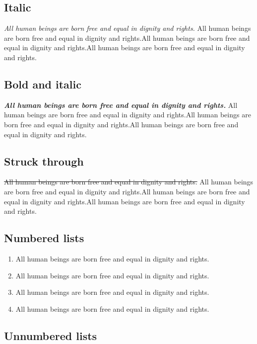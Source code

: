 \documentclass[
]{beamer}
\providecommand{\tightlist}{%
  \setlength{\itemsep}{0pt}\setlength{\parskip}{0pt}}
\begin{document}
\subsection{Italic}\label{italic}

\emph{All human beings are born free and equal in dignity and rights.}
All human beings are born free and equal in dignity and rights.All human
beings are born free and equal in dignity and rights.All human beings
are born free and equal in dignity and rights.

\subsection{Bold and italic}\label{bold-and-italic}

\textbf{\emph{All human beings are born free and equal in dignity and
rights.}} All human beings are born free and equal in dignity and
rights.All human beings are born free and equal in dignity and
rights.All human beings are born free and equal in dignity and rights.

\subsection{Struck through}\label{struck-through}

\st{All human beings are born free and equal in dignity and rights.} All
human beings are born free and equal in dignity and rights.All human
beings are born free and equal in dignity and rights.All human beings
are born free and equal in dignity and rights.

\subsection{Numbered lists}\label{numbered-lists}

\begin{enumerate}
\def\labelenumi{\arabic{enumi}.}
\tightlist
\item
  All human beings are born free and equal in dignity and rights.
\item
  All human beings are born free and equal in dignity and rights.
\item
  All human beings are born free and equal in dignity and rights.
\item
  All human beings are born free and equal in dignity and rights.
\end{enumerate}

\subsection{Unnumbered lists}\label{unnumbered-lists}
\end{document}
